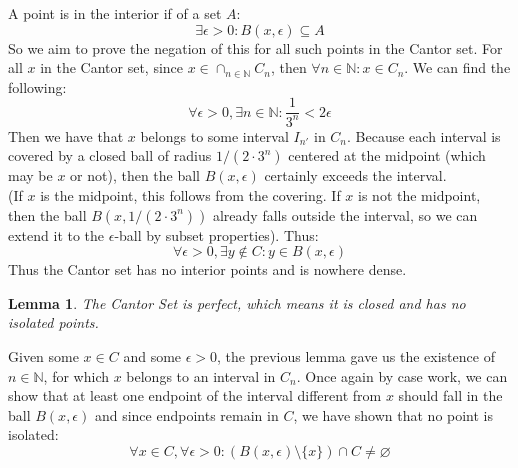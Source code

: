 \documentclass[10pt,letterpaper]{article} %
\newtheorem{lem}{Lemma}[section]
\begin{document}
A point is in the interior if of a set $A$:
\begin{equation*}
  \exists \epsilon > 0: B(x, \epsilon) \subseteq A
\end{equation*} 
So we aim to prove the negation of this for all such points in the Cantor set. For all $x$ in the Cantor set, since $x \in \cap_{n \in \mathbb{N}} C_n$, then $\forall n \in \mathbb{N}: x \in C_n$. We can find the following:
\begin{equation*}
  \forall \epsilon > 0, \exists n \in \mathbb{N}: \frac{1}{3^n} < 2\epsilon
\end{equation*}
Then we have that $x$ belongs to some interval $I_{n'}$ in $C_n$. Because each interval is covered by a closed ball of radius $1/(2 \cdot 3^n)$ centered at the midpoint (which may be $x$ or not), then the ball $B(x, \epsilon)$ certainly exceeds the interval.\\

(If $x$ is the midpoint, this follows from the covering. If $x$ is not the midpoint, then the ball $B(x, 1/(2 \cdot 3^n))$ already falls outside the interval, so we can extend it to the $\epsilon$-ball by subset properties). Thus:
\begin{equation*}
  \forall \epsilon > 0, \exists y \notin C: y \in B(x, \epsilon)
\end{equation*}
Thus the Cantor set has no interior points and is nowhere dense.
\begin{lem}
The Cantor Set is perfect, which means it is closed and has no isolated points.
\end{lem}
Given some $x \in C$ and some $\epsilon > 0$, the previous lemma gave us the existence of $n \in \mathbb{N}$, for which $x$ belongs to an interval in $C_n$. Once again by case work, we can show that at least one endpoint of the interval different from $x$ should fall in the ball $B(x, \epsilon)$ and since endpoints remain in $C$, we have shown that no point is isolated:
\begin{equation*}
  \forall x \in C, \forall \epsilon > 0: (B(x, \epsilon)\setminus \{x\}) \cap C \neq \varnothing
\end{equation*}

\smallskip
\end{document}

